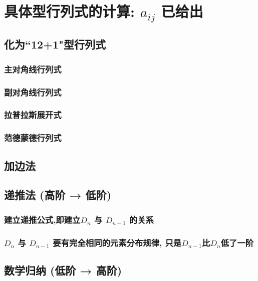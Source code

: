 \documentclass[UTF8]{ctexart}
\begin{document}
	
	
	\section{具体型行列式的计算: $a_{ij}$ 已给出}
	
	\subsection{化为``12+1"型行列式}
	
		\subsubsection{主对角线行列式}
		
		\subsubsection{副对角线行列式}
		
		\subsubsection{拉普拉斯展开式}
		
		\subsubsection{范德蒙德行列式}
	
	\subsection{加边法}
	
	\subsection{递推法 (高阶 → 低阶)}
	
		\subsubsection{建立递推公式,即建立$D_n$ 与 $D_{n-1}$ 的关系}
		
		\subsubsection{$D_n$ 与 $D_{n-1}$ 要有完全相同的元素分布规律, 只是$D_{n-1}$比$D_n$低了一阶 }
	
	
	\subsection{数学归纳 (低阶 → 高阶)}
	
\end{document}

